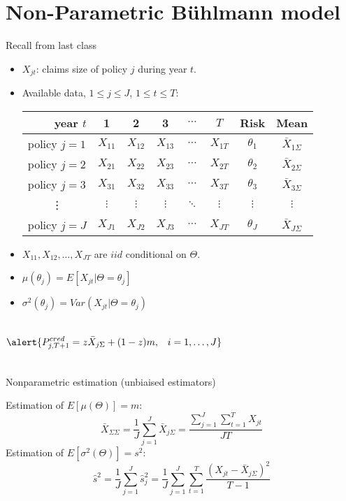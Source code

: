 \documentclass[11pt]{beamer}
\begin{document}
\section{Non-Parametric B\"uhlmann model}
\begin{frame}{Recall from last class}

\begin{itemize}
\item $X_{jt}$: claims size of policy $j$ during year $t$.
\item Available data, $1\le j\le J$, $1\le t \le T$:
\begin{tabular}{l|ccccc|cc}
\multicolumn{1}{r}{year $t$} & 1 & 2 & 3 & $\cdots$ & $T$ & Risk & Mean \\ \hline
policy $j=1$ & $X_{11}$ & $X_{12}$ & $X_{13}$ & $\cdots$ & $X_{1T}$ & $\theta_1$ & $\bar{X}_{1\Sigma}$ \\
policy $j=2$ & $X_{21}$ & $X_{22}$ & $X_{23}$ & $\cdots$ & $X_{2T}$ & $\theta_2$ & $\bar{X}_{2\Sigma}$ \\
policy $j=3$ & $X_{31}$ & $X_{32}$ & $X_{33}$ & $\cdots$ & $X_{3T}$ & $\theta_3$ & $\bar{X}_{3\Sigma}$ \\
\multicolumn{1}{c|}{\vdots} & $\vdots$ & $\vdots$ & $\vdots$ & $\ddots$ & $\vdots$ & $\vdots$ & $\vdots$ \\
policy $j=J$ & $X_{J1}$ & $X_{J2}$ & $X_{J3}$ & $\cdots$ & $X_{JT}$ & $\theta_J$ & $\bar{X}_{J\Sigma}$
\end{tabular}
\item $X_{11},X_{12},\ldots,X_{JT}$ are $iid$ conditional on $\Theta$.
\item $\mu(\theta_j)=E[X_{jt}|\Theta=\theta_j]$
\item $\sigma^2(\theta_j)=Var(X_{jt}|\Theta=\theta_j)$
\end{itemize}
\begin{columns}
\begin{equation}\alert{P^{cred}_{j,T+1}=z \bar{X}_{j\Sigma} + (1-z)m,\;\;\;i=1,\ldots,J}\end{equation}
\end{columns}

\end{frame}
\begin{frame}{Nonparametric estimation (unbiaised estimators)}

Estimation of $E[\mu(\Theta)]=m$:
\begin{equation}\bar{X}_{\Sigma\Sigma}=\frac{1}{J}\sum_{j=1}^J \bar{X}_{j\Sigma}=\frac{\sum_{j=1}^J\sum_{t=1}^T X_{jt}}{JT}\end{equation}
Estimation of $E[\sigma^2(\Theta)]=s^2$:
\begin{equation}\hat{s}^2=\frac{1}{J}\sum_{j=1}^J\hat{s}_j^2=\frac{1}{J}\sum_{j=1}^J \sum_{t=1}^T \frac{(X_{jt}-\bar{X}_{j\Sigma})^2}{T-1}\end{equation}

\end{frame}
\end{document}
